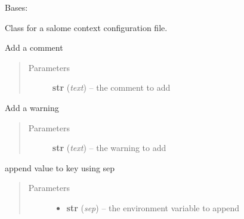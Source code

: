 \documentclass[a4paper,10pt,english]{sphinxmanual}
\begin{document}

\begin{fulllineitems}
\label{commands/apidoc/src:src.fileEnviron.ContextFileEnviron}
Bases: {\hyperref[commands/apidoc/src:src.fileEnviron.FileEnviron]{}}

Class for a salome context configuration file.

\begin{fulllineitems}
\label{commands/apidoc/src:src.fileEnviron.ContextFileEnviron.add_echo}
Add a comment
\begin{quote}\begin{description}
\item[{Parameters}] \leavevmode
\textbf{str} (\emph{text}) -- the comment to add

\end{description}\end{quote}

\end{fulllineitems}


\begin{fulllineitems}
\label{commands/apidoc/src:src.fileEnviron.ContextFileEnviron.add_warning}
Add a warning
\begin{quote}\begin{description}
\item[{Parameters}] \leavevmode
\textbf{str} (\emph{text}) -- the warning to add

\end{description}\end{quote}

\end{fulllineitems}


\begin{fulllineitems}
\label{commands/apidoc/src:src.fileEnviron.ContextFileEnviron.append_value}
append value to key using sep
\begin{quote}\begin{description}
\item[{Parameters}] \leavevmode\begin{itemize}
\item {} 
\textbf{str} (\emph{sep}) -- the environment variable to append


\end{itemize}
\end{description}
\end{quote}
\end{fulllineitems}
\end{fulllineitems}
\end{document}
